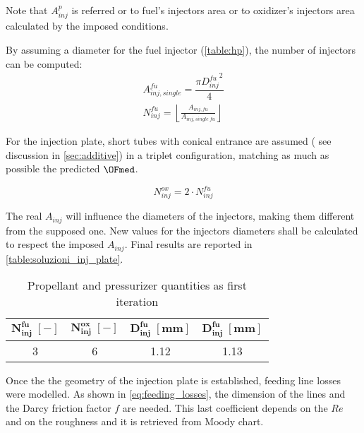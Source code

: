 Note that $A_{inj}^p$ is referred or to fuel's injectors area or to oxidizer's injectors area calculated by the imposed conditions.

By assuming a diameter for the fuel injector (\autoref{table:hp}), the number of injectors can be computed: 
\vspace{-0.5cm}
\begin{gather}
    A_{inj, single}^{fu} = \dfrac{\pi {D_{inj}^{fu}}^2}{4}
    \label{eq:aree_inj}
    \\
    N_{inj}^{fu} = \left\lfloor \frac{A_{inj,fu}}{A_{inj,single\;fu}}\right\rfloor
    \label{eq:number_fu_inj}
\end{gather}

For the injection plate, short tubes with conical entrance are assumed ( see discussion in \autoref{sec:additive}) in a triplet configuration, matching as much as possible the predicted $\OFmed$.

\begin{equation}
    N_{inj}^{ox} = 2 \cdot N_{inj}^{fu}
    \label{eq:number_ox_inj}
\end{equation} 

The real $A_{inj}$ will influence the diameters of the injectors, making them different from the supposed one. New values for the injectors diameters shall be calculated to respect the imposed $A_{inj}$. Final results are reported in \autoref{table:soluzioni_inj_plate}.

\begin{table}[H]
    \renewcommand{\arraystretch}{1.5}
    \centering
    \begin{tabular}{|c|c|c|c|}
        \hline
        $\boldsymbol{N_{inj}^{fu}\; [-]}$ & $\boldsymbol{N_{inj}^{ox}\; [-]}$ & $\boldsymbol{D_{inj}^{fu} \; [\textbf{mm}]}$ & $\boldsymbol{D_{inj}^{fu} \; [\textbf{mm}]}$ \\
        \hline
        \hline
        3 & 6 & 1.12 & 1.13 \\
        \hline
    \end{tabular}
    \caption{Propellant and pressurizer quantities as first iteration}
    \label{table:soluzioni_inj_plate}
\end{table}


Once the the geometry of the injection plate is established, feeding line losses were modelled. As shown in \autoref{eq:feeding_losses}, the dimension of the lines and the Darcy friction factor $f$ are needed. This last coefficient depends on the $Re$ and on the roughness and it is retrieved from Moody chart\cite{colebrook}. 

